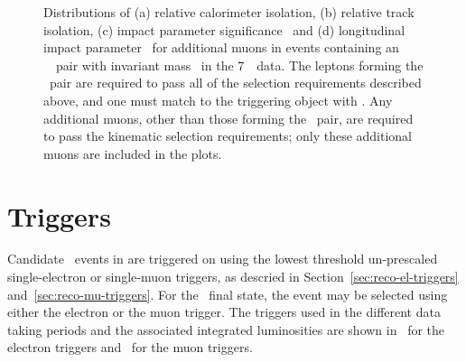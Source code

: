 \begin{figure}[h]
{        }
    \caption[ Distributions of relative track and calorimeter isolation, \dzerosig\
    and \zzero\ for additional muons in events containing a dilepton pair with mass
    \sstooos\ in 7~\tev\ data.]
    {Distributions of (a) relative calorimeter isolation,
    (b) relative track isolation, (c) impact parameter significance \dzerosig\ and
    (d) longitudinal impact parameter \zzero\ for additional muons
    in events containing an \ossf\ \dilepton\ pair with invariant mass \sstooos\
    in the 7~\tev\ data.
    The leptons forming the \dilepton\ pair are required to pass all of the
    selection requirements described above, and one must match to the triggering
    object with \ptgt{25}. Any additional muons, other than those forming the
    \dilepton\ pair, are required to pass the kinematic selection requirements; only
    these additional muons are included in the plots.}
\label{fig:objsel-mu}
\end{figure}

\section{Triggers}
\label{sec:triggers}

Candidate \ZZ\ events in are triggered on using the lowest threshold un-prescaled single-electron or
single-muon triggers, as descried in Section~\ref{sec:reco-el-triggers}
and~\ref{sec:reco-mu-triggers}. For the \eemm\ final state, the event may be selected using either
the electron or the muon trigger. The triggers used in the
different data taking periods and the
associated integrated luminosities are shown in~ for the electron
triggers and~\tab{objSel-trigger-mu} for the muon triggers.

